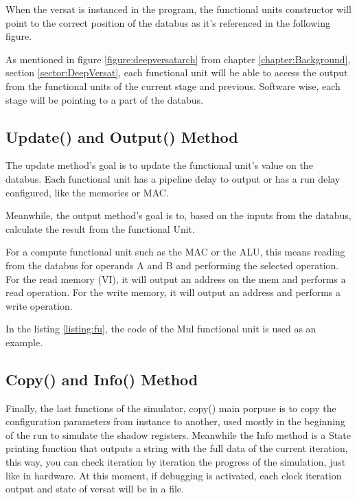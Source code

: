When the versat is instanced in the program, the functional units constructor will point
to the correct position of the databus as it's referenced in the following figure.

As mentioned in figure \ref{figure:deepversatarch} from chapter \ref{chapter:Background}, section \ref{sector:DeepVersat}, 
each functional unit will be able to access the output from the functional units of the
current stage and previous. Software wise, each stage will be pointing to a part of the databus.  



\subsection{Update() and Output() Method}


The update method's goal is to update the functional unit's value on the databus. 
Each functional unit has a pipeline delay to output or has a run delay configured, 
like the memories or MAC.

Meanwhile, the output method's goal is to, based on the inputs from the databus, calculate the result from
 the functional Unit.

 For a compute functional unit such as the MAC or the ALU, this means reading from the databus for operands A and B
 and performing the selected operation. For the read memory (VI), it will output an address on the mem
 and performs a read operation. For the write memory, it will output an address and performs a write operation.

 In the listing \ref{listing:fu}, the code of the Mul functional unit is used as an example.

 \newpage
 


\subsection{Copy() and Info() Method}

Finally, the last functions of the simulator, copy() main porpuse is to copy the configuration parameters from instance to another,
used mostly in the beginning of the run to simulate the shadow registers.
Meanwhile the Info method is a State printing function that outputs a string with the full data of the current iteration,
this way, you can check iteration by iteration the progress of the simulation, just like in hardware.
At this moment, if debugging is activated, each clock iteration output and state of versat will be in a file.


